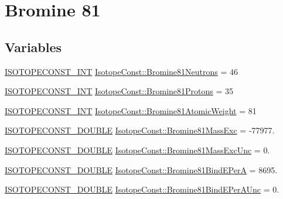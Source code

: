 \hypertarget{group___isotope_const-_bromine-_br81}{}\section{Bromine 81}
\label{group___isotope_const-_bromine-_br81}
\subsection*{Variables}
\begin{DoxyCompactItemize}
\item 
\mbox{\hyperlink{group___isotope_const-_macros_ga5f18360b3e99483a35c32d789e62621c}{I\+S\+O\+T\+O\+P\+E\+C\+O\+N\+S\+T\+\_\+\+I\+NT}} \mbox{\hyperlink{group___isotope_const-_bromine-_br81_ga0e133759293b796b1405b74a868b1617}{Isotope\+Const\+::\+Bromine81\+Neutrons}} = 46
\item 
\mbox{\hyperlink{group___isotope_const-_macros_ga5f18360b3e99483a35c32d789e62621c}{I\+S\+O\+T\+O\+P\+E\+C\+O\+N\+S\+T\+\_\+\+I\+NT}} \mbox{\hyperlink{group___isotope_const-_bromine-_br81_gac87e8e62fbaeeb2dcc14c44fd904fc38}{Isotope\+Const\+::\+Bromine81\+Protons}} = 35
\item 
\mbox{\hyperlink{group___isotope_const-_macros_ga5f18360b3e99483a35c32d789e62621c}{I\+S\+O\+T\+O\+P\+E\+C\+O\+N\+S\+T\+\_\+\+I\+NT}} \mbox{\hyperlink{group___isotope_const-_bromine-_br81_gad74f1dccd2f7409ff3352c0a79c742cd}{Isotope\+Const\+::\+Bromine81\+Atomic\+Weight}} = 81
\item 
\mbox{\hyperlink{group___isotope_const-_macros_ga8f45a7272ce02c0b4c65c44636ed719a}{I\+S\+O\+T\+O\+P\+E\+C\+O\+N\+S\+T\+\_\+\+D\+O\+U\+B\+LE}} \mbox{\hyperlink{group___isotope_const-_bromine-_br81_ga7bf0d801a96d83a4eae94b1d606efcdf}{Isotope\+Const\+::\+Bromine81\+Mass\+Exc}} = -\/77977.
\item 
\mbox{\hyperlink{group___isotope_const-_macros_ga8f45a7272ce02c0b4c65c44636ed719a}{I\+S\+O\+T\+O\+P\+E\+C\+O\+N\+S\+T\+\_\+\+D\+O\+U\+B\+LE}} \mbox{\hyperlink{group___isotope_const-_bromine-_br81_ga7d5aba856014d4665cd26deee46ffc27}{Isotope\+Const\+::\+Bromine81\+Mass\+Exc\+Unc}} = 0.
\item 
\mbox{\hyperlink{group___isotope_const-_macros_ga8f45a7272ce02c0b4c65c44636ed719a}{I\+S\+O\+T\+O\+P\+E\+C\+O\+N\+S\+T\+\_\+\+D\+O\+U\+B\+LE}} \mbox{\hyperlink{group___isotope_const-_bromine-_br81_gad680378e2cd241952e3f59a41a3cdc1e}{Isotope\+Const\+::\+Bromine81\+Bind\+E\+PerA}} = 8695.
\item 
\mbox{\hyperlink{group___isotope_const-_macros_ga8f45a7272ce02c0b4c65c44636ed719a}{I\+S\+O\+T\+O\+P\+E\+C\+O\+N\+S\+T\+\_\+\+D\+O\+U\+B\+LE}} \mbox{\hyperlink{group___isotope_const-_bromine-_br81_ga686c6833d37e7c441fa33a6a1ae06f0a}{Isotope\+Const\+::\+Bromine81\+Bind\+E\+Per\+A\+Unc}} = 0.

\end{DoxyCompactItemize}
